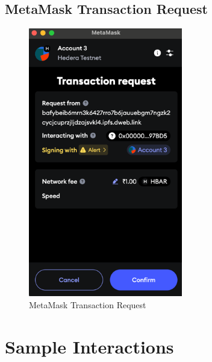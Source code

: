 \documentclass[12pt,a4paper]{article}
\begin{document}
    \subsection{MetaMask Transaction Request}
    \begin{figure}[H]
        \centering
        \includegraphics[width=0.6\textwidth]{screenshots/metamask transaction request.png}
        \caption{MetaMask Transaction Request}
        \label{fig:txn-request}
    \end{figure}


    \section{Sample Interactions}
\end{document}
